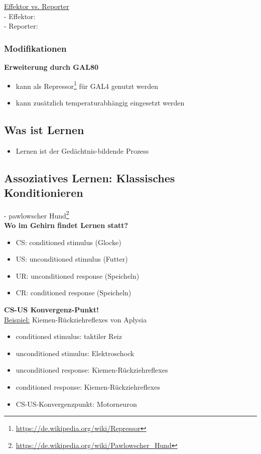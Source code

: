 \underline{Effektor vs. Reporter}\\
 - Effektor: \\
 - Reporter: \\

\subsubsection{Modifikationen}

\textbf{Erweiterung durch GAL80}
\begin{itemize}
	\item kann als Repressor\footnote{\url{https://de.wikipedia.org/wiki/Repressor}} für GAL4 genutzt werden
	\item kann zusätzlich temperaturabhängig eingesetzt werden
\end{itemize}

\subsection{Was ist Lernen}
\begin{itemize}
	\item Lernen ist der Gedächtnis-bildende Prozess
\end{itemize}

\subsection{Assoziatives Lernen: Klassisches Konditionieren}
 - pawlowscher Hund\footnote{\url{https://de.wikipedia.org/wiki/Pawlowscher_Hund}}\\

\textbf{Wo im Gehirn findet Lernen statt?}
\begin{itemize}
	\item CS: conditioned stimulus (Glocke)
	\item US: unconditioned stimulus (Futter)
	\item UR: unconditioned response (Speicheln)
	\item CR: conditioned response (Speicheln)
\end{itemize}
\newpage
\textbf{CS-US Konvergenz-Punkt!}\\

\underline{Beispiel:} Kiemen-Rückziehreflexes von Aplysia
\begin{itemize}
	\item conditioned stimulus: taktiler Reiz
	\item unconditioned stimulus: Elektroschock
	\item unconditioned response: Kiemen-Rückziehreflexes
	\item conditioned response: Kiemen-Rückziehreflexes
	\item CS-US-Konvergenzpunkt: Motorneuron
\end{itemize}

